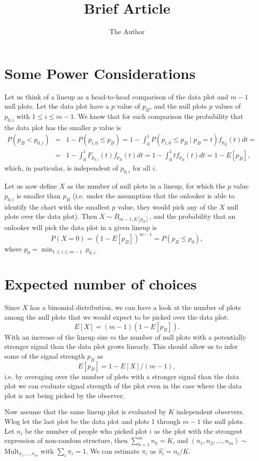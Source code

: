 \documentclass[11pt]{article}
\title{Brief Article}
\author{The Author}
\begin{document}
\section{Some Power Considerations}

Let us think of a lineup as a head-to-head comparison of the data plot and $m-1$ null plots. Let the data plot have a $p$ value of $p_B$, and the null plots $p$ values of $p_{0, i}$ with $1 \le i \le m-1$.
We know that for each comparison the probability that the data plot has the smaller $p$ value is 
\begin{eqnarray*}
P(p_B < p_{0,i}) &=& 1 - P(p_{i,0} \le p_B) = 1- \int_0^1  P(p_{i,0} \le p_B \mid p_B=t) f_{p_B}(t) dt =  \\
&=& 1 - \int_0^1 F_{p_{0,i}}(t) f_{p_B}(t) dt = 1 - \int_0^1 t f_{p_B}(t) dt = 1 - E[p_B],
\end{eqnarray*}
which, in particular, is independent of $p_{0,i}$ for all $i$.

Let us now define $X$ as the number of null plots in a lineup, for which the $p$ value $p_{0,i}$ is smaller than $p_B$ (i.e. under the assumption that the onlooker is able to identify the chart with the smallest $p$ value, they would pick any of the $X$  null plots over the data plot). 
Then $X \sim B_{m-1, E[p_B]}$, and the probability that an onlooker will pick the data plot in a given lineup is 
\[
P(X=0) = \left(1 - E[p_B] \right)^{m-1} = P(p_B \le p_0),
\]
where $p_0 = \min_{1 \le i \le m-1}  \ p_{0,i}$

\section{Expected number of choices}
Since $X$ has a binomial distribution, we can have a look at the number of plots among the null plots that we would expect to be picked over the data plot:
\[
E[X] = (m-1)(1-E[p_B]).
\]
With an increase of the lineup size $m$ the number of null plots with a potentially stronger signal than the data plot grows linearly.
This should allow us to infer some of the signal strength $p_B$ as
\[
E[p_B] = 1 - E[X]/(m-1),
\]
i.e. by averaging over the number of plots with  a stronger signal than the data plot we can evaluate signal strength of the plot even in the case where the data plot is not being picked by the observer.

Now assume that the same lineup plot is evaluated by $K$ independent observers. Wlog let the last plot be the data plot and plots 1 through $m-1$ the null plots. Let $n_i$ be the number of people who picked plot $i$ as the plot with the strongest expression of non-random structure, then $\sum_{k=1}^{m} n_k = K$, and $(n_1, n_2, ..., n_m) \sim$ Mult$_{\pi_1, ..., \pi_m}$ with $\sum_i \pi_i = 1$. We can estimate $\pi_i$ as $\widehat{\pi_i} = n_i/K$. 
\end{document}
